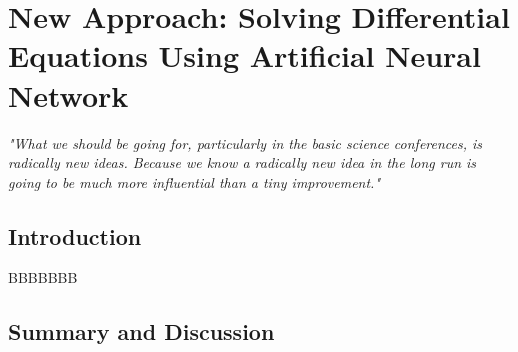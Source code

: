 \clearpage{\pagestyle{empty}\cleardoublepage}		%
\chapter{New Approach: Solving Differential Equations Using Artificial Neural Network}
\label{chap:improvement}

\begin{flushright}
\textit{"What we should be going for, particularly in the basic science conferences, is radically new ideas. Because we know a radically new idea in the long run is going to be much more influential than a tiny improvement."}
\end{flushright}
\vspace{1cm}
%
\section{Introduction}
BBBBBBB


\section{Summary and Discussion}

